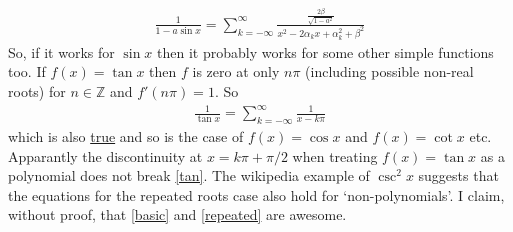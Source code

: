 \documentclass{article}
\begin{document}
\begin{align}
    \frac{1}{1 - a \sin x} = \sum_{k = -\infty}^{\infty} \frac{\frac{2\beta}{\sqrt{1-a^2}}}{x^2 - 2\alpha_k x + \alpha_k^2 + \beta^2}
\end{align}
So, if it works for $\sin x$ then it probably works for some other simple functions too. If $f(x) = \tan x$ then $f$ is zero at only $n\pi$ (including possible non-real roots) for $n \in \mathbb{Z}$ and $f'(n\pi) = 1$. So
\begin{align}
    \frac{1}{\tan x} = \sum_{k = -\infty}^{\infty} \frac{1}{x-k\pi} \label{tan}
\end{align}
which is also \href{https://en.wikipedia.org/wiki/Trigonometric_functions#Partial_fraction_expansion}{true} and so is the case of $f(x) = \cos x$ and $f(x) = \cot x$ etc. Apparantly the discontinuity at $x = k\pi + \pi/2$ when treating $f(x) = \tan x$ as a polynomial does not break \eqref{tan}. The wikipedia example of $\csc^2 x$ suggests that the equations for the repeated roots case also hold for `non-polynomials'. I claim, without proof, that \eqref{basic} and \eqref{repeated} are awesome.

\end{document}
